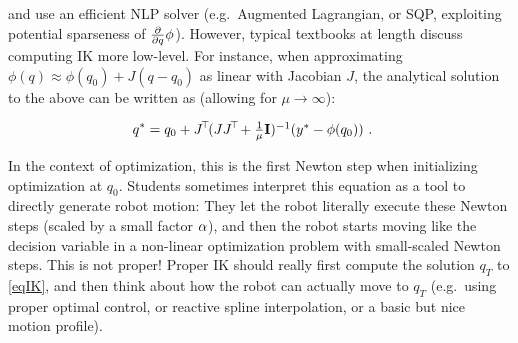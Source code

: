 and use an efficient NLP solver (e.g.\ Augmented Lagrangian, or SQP,
exploiting potential sparseness of $\textstyle\frac{\partial}{\partial q} \phi$). However, typical
textbooks at length discuss computing IK more low-level. For instance,
when approximating $\phi(q) \approx \phi(q_0) + J (q-q_0)$ as linear
with Jacobian $J$, the analytical solution to the above can be written
as (allowing for $\mu\to\infty$):

\begin{align*}
q^*
&= q_0 +  J^{\!\top\!} (J J^{\!\top\!} + \textstyle\frac{1}{\mu} {\rm\bf I})^{-1} (y^*-\phi(q_0)) ~.
\end{align*}

In the context of optimization, this is the first Newton step when
initializing optimization at $q_0$. Students sometimes interpret this
equation as a tool to directly generate robot motion: They let the
robot literally execute these Newton steps (scaled by a small factor
$\alpha$), and then the robot starts moving like the decision variable in
a non-linear optimization problem with small-scaled Newton steps. This
is not proper! Proper IK should really first compute the solution
$q_T$ to
\eqref{eqIK}, and then think about how the robot can actually move
to $q_T$ (e.g.\ using proper optimal control, or reactive spline interpolation, or
a basic but nice motion profile).





